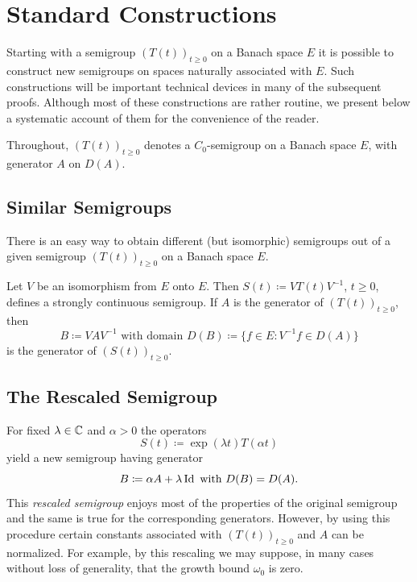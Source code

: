 \section{Standard Constructions}\label{sec:a1-3}%
Starting with a semigroup $(T(t))_{t \geq 0}$ on a Banach space $E$ it is possible to construct new semigroups on spaces naturally associated with $E$.
Such constructions will be important technical devices in many of the subsequent proofs.
Although most of these constructions are rather routine, we present below a systematic account of them for the convenience of the reader.

Throughout, $(T(t))_{t \geq 0}$ denotes a $C_0$-semigroup on a Banach space $E$, with generator $A$ on $D(A)$.
\subsection{Similar Semigroups}\label{subsec:a1-3.1}%

There is an easy way to obtain different (but isomorphic) semigroups out of a given semigroup $(T(t))_{t \geq 0}$ on a Banach space $E$.

Let $V$ be an isomorphism from $E$ onto $E$.
Then $S(t) \coloneq VT(t)V^{-1}$, $t \geq 0$, defines a strongly continuous semigroup.
If\/ $A$ is the generator of\/ $(T(t))_{t \geq 0}$, then
\[
    B \coloneq VAV^{-1} \text{ with domain } D(B) \coloneq \{f \in E \colon V^{-1}f \in D(A)\}
\]
is the generator of\/ $(S(t))_{t \geq 0}$.
\subsection{The Rescaled Semigroup}\label{subsec:a1-3.2}%
For fixed $\lambda \in \mathbb{C}$ and $\alpha > 0$ the operators
\[
    S(t) \coloneq \exp(\lambda t)T(\alpha t)
\]
yield a new semigroup having generator
\[
    B \coloneq \alpha A + \lambda \operatorname{Id} \text{ with } D(B) = D(A) .
\]
This \emph{rescaled semigroup} enjoys most of the properties of the original semigroup and the same is true for the corresponding generators.
However, by using this procedure certain constants associated with $(T(t))_{t \geq 0}$ and $A$ can be normalized.
For example, by this rescaling we may suppose, in many cases without loss of generality, that the growth bound $\omega_{0}$ is zero.

